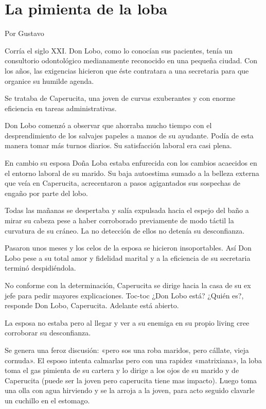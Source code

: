 \documentclass[11pt,twoside,openright,a5paper]{book}
\begin{document}
\section*{La pimienta de la loba}

\begin{flushright}Por Gustavo\end{flushright}

Corría el siglo XXI. Don Lobo, como lo conocían sus pacientes, tenía un consultorio odontológico medianamente reconocido en una pequeña ciudad. Con los años, las exigencias hicieron que éste contratara a una secretaria para que organice su humilde agenda. 

Se trataba de Caperucita, una joven de curvas exuberantes y con enorme eficiencia en tareas administrativas.

Don Lobo comenzó a observar que ahorraba mucho tiempo con el desprendimiento de los salvajes papeles a manos de su ayudante. Podía de esta manera tomar más turnos diarios. Su satisfacción laboral era casi plena.

En cambio su esposa Doña Loba estaba enfurecida con los cambios acaecidos en el entorno laboral de su marido. Su baja autoestima sumado a la belleza externa que veía en Caperucita, acrecentaron a pasos agigantados sus sospechas de engaño por parte del lobo.

Todas las mañanas se despertaba y salía expulsada hacia el espejo del baño a mirar su cabeza pese a haber corroborado previamente de modo táctil la curvatura de su cráneo. La no detección de ellos no detenía su desconfianza.

Pasaron unos meses y los celos de la esposa se hicieron insoportables. Así Don Lobo pese a su total amor y fidelidad marital y a la eficiencia de su secretaria terminó despidiéndola.

No conforme con la determinación, Caperucita se dirige hacia la casa de su ex jefe para pedir mayores explicaciones. Toc-toc ¿Don Lobo está? ¿Quién es?, responde Don Lobo,  Caperucita. Adelante está abierto.

La esposa no estaba pero al llegar y ver a su enemiga en su propio living cree corroborar su desconfianza.

Se genera una feroz discusión: «pero sos una roba maridos, pero cállate, vieja cornuda». El esposo intenta calmarlas pero con una rapidez «matrixiana», la loba toma el gas pimienta de su cartera y lo dirige a los  ojos de su marido y de Caperucita (puede ser la joven pero caperucita tiene mas impacto). Luego toma una olla con agua hirviendo y se la arroja a la joven, para acto seguido clavarle un cuchillo en el estomago. 
\end{document}
